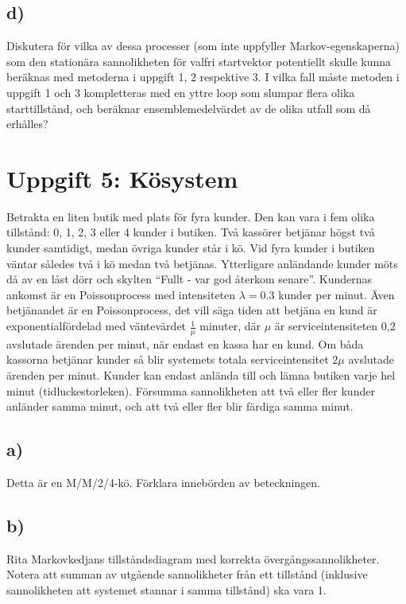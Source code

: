 \documentclass[a4paper]{article}
\begin{document}
\subsection{d)}
Diskutera för vilka av dessa processer (som inte uppfyller Markov-egenskaperna) som den
stationära sannolikheten för valfri startvektor potentiellt skulle kunna beräknas med
metoderna i uppgift 1, 2 respektive 3. I vilka fall måste metoden i uppgift 1 och 3 kompletteras
med en yttre loop som slumpar flera olika starttillstånd, och beräknar ensemblemedelvärdet
av de olika utfall som då erhålles?

\newpage
\section{Uppgift 5: Kösystem}
Betrakta en liten butik med plats för fyra kunder. Den kan vara i fem olika tillstånd: 0, 1, 2, 3
eller 4 kunder i butiken. Två kassörer betjänar högst två kunder samtidigt, medan övriga
kunder står i kö. Vid fyra kunder i butiken väntar således två i kö medan två betjänas.
Ytterligare anländande kunder möts då av en låst dörr och skylten ``Fullt - var god återkom
senare''. Kundernas ankomst är en Poissonprocess med intensiteten \( \lambda =0.3\) kunder per minut.
Även betjänandet är en Poissonprocess, det vill säga tiden att betjäna en kund är
exponentialfördelad med väntevärdet \( \frac{1}{\mu} \) minuter, där \( \mu \) är serviceintensiteten 0,2 avslutade
ärenden per minut, när endast en kassa har en kund. Om båda kassorna betjänar kunder så
blir systemets totala serviceintensitet \( 2\mu  \) avslutade ärenden per minut. Kunder kan endast
anlända till och lämna butiken varje hel minut (tidluckestorleken). Försumma sannolikheten
att två eller fler kunder anländer samma minut, och att två eller fler blir färdiga samma minut.

\subsection{a)}
Detta är en M/M/2/4-kö. Förklara innebörden av beteckningen.

\subsection{b)}
Rita Markovkedjans tillståndsdiagram med korrekta övergångssannolikheter. Notera
att summan av utgående sannolikheter från ett tillstånd (inklusive sannolikheten att
systemet stannar i samma tillstånd) ska vara 1.
\end{document}
